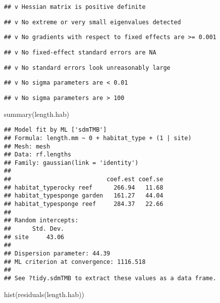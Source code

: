 \documentclass[
]{article}
\newenvironment{Shaded}{\begin{snugshade}}{\end{snugshade}}
\newcommand{\FunctionTok}[1]{\textcolor[rgb]{0.00,0.00,0.00}{#1}}
\newcommand{\NormalTok}[1]{#1}
\begin{document}
\begin{verbatim}
## v Hessian matrix is positive definite
\end{verbatim}

\begin{verbatim}
## v No extreme or very small eigenvalues detected
\end{verbatim}

\begin{verbatim}
## v No gradients with respect to fixed effects are >= 0.001
\end{verbatim}

\begin{verbatim}
## v No fixed-effect standard errors are NA
\end{verbatim}

\begin{verbatim}
## v No standard errors look unreasonably large
\end{verbatim}

\begin{verbatim}
## v No sigma parameters are < 0.01
\end{verbatim}

\begin{verbatim}
## v No sigma parameters are > 100
\end{verbatim}

\begin{Shaded}
\begin{Highlighting}[]
\FunctionTok{summary}\NormalTok{(length.hab)}
\end{Highlighting}
\end{Shaded}

\begin{verbatim}
## Model fit by ML ['sdmTMB']
## Formula: length.mm ~ 0 + habitat_type + (1 | site)
## Mesh: mesh
## Data: rf.lengths
## Family: gaussian(link = 'identity')
##  
##                           coef.est coef.se
## habitat_typerocky reef      266.94   11.68
## habitat_typesponge garden   161.27   44.04
## habitat_typesponge reef     284.37   22.66
## 
## Random intercepts:
##      Std. Dev.
## site     43.06
## 
## Dispersion parameter: 44.39
## ML criterion at convergence: 1116.518
## 
## See ?tidy.sdmTMB to extract these values as a data frame.
\end{verbatim}

\begin{Shaded}
\begin{Highlighting}[]
\FunctionTok{hist}\NormalTok{(}\FunctionTok{residuals}\NormalTok{(length.hab)) }
\end{Highlighting}
\end{Shaded}
\end{document}
